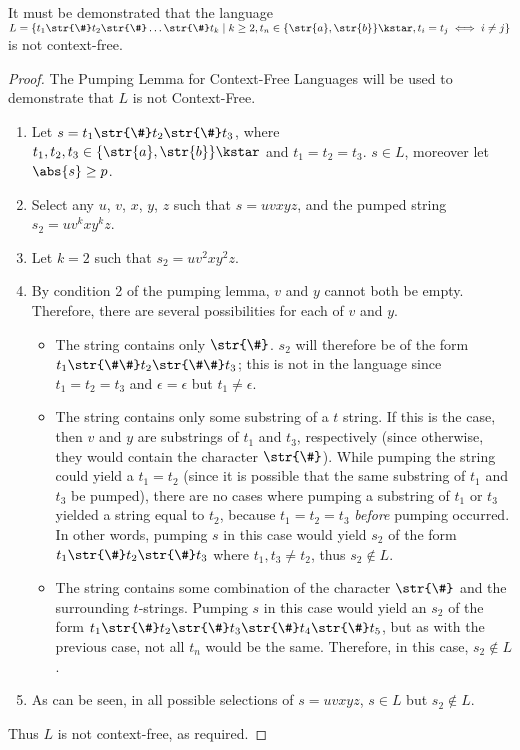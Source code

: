 It must be demonstrated that the language $L = \{ t_1\str{\#}t_2\str{\#}\dots\str{\#}t_k \mid k \geq 2, t_n \in \{\str{a}, \str{b}\}\kstar, t_i = t_j \iff i \neq j\}$ is not context-free.
\begin{proof}
	The Pumping Lemma for Context-Free Languages will be used to demonstrate that $L$ is not Context-Free.
	\begin{enumerate}[label=\Roman*.]
		\item Let $s = t_1\str{\#}t_2\str{\#}t_3$, where $t_1, t_2, t_3 \in \{\str{a}, \str{b}\}\kstar$ and $t_1 = t_2 = t_3$. $s \in L$, moreover let $\abs{s} \geq p$.
		\item Select any $u$, $v$, $x$, $y$, $z$ such that $s = uvxyz$, and the pumped string $s_2 = uv^kxy^kz$.
		\item Let $k = 2$ such that $s_2 = uv^2xy^2z$.
		\item By condition 2 of the pumping lemma, $v$ and $y$ cannot both be empty. Therefore, there are several possibilities for each of $v$ and $y$.
		\begin{itemize}
			\item The string contains only $\str{\#}$. $s_2$ will therefore be of the form $t_1\str{\#\#}t_2\str{\#\#}t_3$; this is not in the language since $t_1 = t_2 = t_3$ and $\epsilon = \epsilon$ but $t_1 \neq \epsilon$.
			\item The string contains only some substring of a $t$ string. If this is the case, then $v$ and $y$ are substrings of $t_1$ and $t_3$, respectively (since otherwise, they would contain the character $\str{\#}$). While pumping the string could yield a $t_1 = t_2$ (since it is possible that the same substring of $t_1$ and $t_3$ be pumped), there are no cases where pumping a substring of $t_1$ or $t_3$ yielded a string equal to $t_2$, because $t_1 = t_2 = t_3$ \emph{before} pumping occurred. In other words, pumping $s$ in this case would yield $s_2$ of the form $t_1\str{\#}t_2\str{\#}t_3$ where $t_1, t_3 \neq t_2$, thus $s_2 \notin L$.
			\item The string contains some combination of the character $\str{\#}$ and the surrounding $t$-strings. Pumping $s$ in this case would yield an $s_2$ of the form $t_1\str{\#}t_2\str{\#}t_3\str{\#}t_4\str{\#}t_5$, but as with the previous case, not all $t_n$ would be the same. Therefore, in this case, $s_2 \notin L$. 
		\end{itemize}
		\item As can be seen, in all possible selections of $s = uvxyz$, $s \in L$ but $s_2 \notin L$.
	\end{enumerate}
	Thus $L$ is not context-free, as required.
\end{proof}